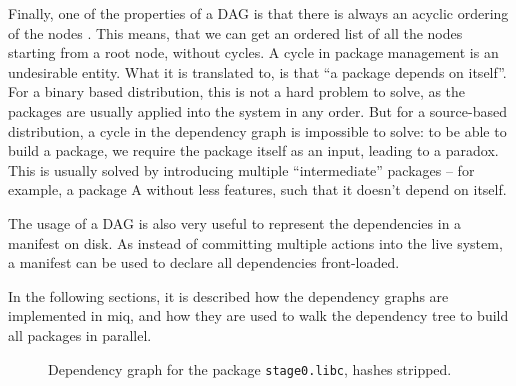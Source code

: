 Finally, one of the properties of a \ac{DAG} is that there
is always an acyclic ordering of the nodes
\cite{bang-jensenDigraphs2009}. This means, that we can get
an ordered list of all the nodes starting from a root node,
without cycles. A cycle in package management is an
undesirable entity. What it is translated to, is that ``a
package depends on itself''. For a binary based
distribution, this is not a hard problem to solve, as the
packages are usually applied into the system in any order.
But for a source-based distribution, a cycle in the
dependency graph is impossible to solve: to be able to build
a package, we require the package itself as an input,
leading to a paradox. This is usually solved by introducing
multiple ``intermediate'' packages -- for example, a package
A without less features, such that it doesn't depend on
itself.

The usage of a \ac{DAG} is also very useful to represent the
dependencies in a manifest on disk. As instead of committing
multiple actions into the live system, a manifest can be
used to declare all dependencies front-loaded.

In the following sections, it is described how the dependency
graphs are implemented in miq, and how they are used to walk
the dependency tree to build all packages in parallel.

\begin{figure}[hbtp]
    \centerfloat
    
    \caption{Dependency graph for the package
    \texttt{stage0.libc}, hashes stripped.}
    \label{fig:m4_graph}
\end{figure}
